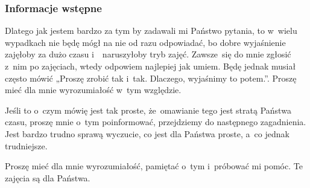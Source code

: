 \documentclass[10pt,t]{beamer}
\begin{document}
\begin{frame}
  \frametitle{Informacje wstępne}


  Dlatego jak jestem \alert{bardzo} za tym by zadawali mi Państwo pytania,
  to w~wielu wypadkach nie będę mógł na nie od razu odpowiadać, bo
  dobre wyjaśnienie zajęłoby za dużo czasu i~~naruszyłoby tryb zajęć.
  Zawsze~się do mnie zgłosić z~nim po zajęciach, wtedy odpowiem najlepiej
  jak umiem. Będę jednak musiał często mówić „Proszę zrobić tak i~tak.
  Dlaczego, wyjaśnimy to potem.”. Proszę mieć dla mnie wyrozumiałość w~tym
  względzie.

  Jeśli to o~czym mówię jest tak proste, że~omawianie tego jest stratą
  Państwa czasu, proszę mnie o~tym poinformować, przejdziemy do następnego
  zagadnienia. Jest bardzo trudno sprawą wyczucie, co jest dla Państwa
  proste, a~co jednak trudniejsze.

  Proszę mieć dla mnie wyrozumiałość, pamiętać o~tym i~próbować mi pomóc.
  Te zajęcia są dla Państwa.






\end{frame}
\end{document}
